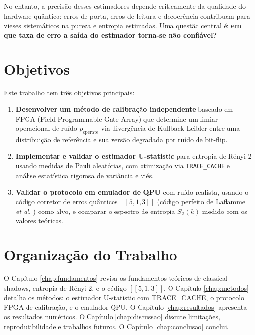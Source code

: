 \documentclass[12pt,a4paper,oneside]{book}
\theoremstyle{definition}
\theoremstyle{remark}
\begin{document}
No entanto, a precisão desses estimadores depende criticamente da qualidade do hardware quântico: erros de porta, erros de leitura e decoerência contribuem para vieses sistemáticos na pureza e entropia estimadas. Uma questão central é: \textbf{em que taxa de erro a saída do estimador torna-se não confiável?}

\section{Objetivos}

Este trabalho tem três objetivos principais:

\begin{enumerate}
    \item \textbf{Desenvolver um método de calibração independente} baseado em FPGA (Field-Programmable Gate Array) que determine um limiar operacional de ruído $p_{\text{operate}}$ via divergência de Kullback-Leibler entre uma distribuição de referência e sua versão degradada por ruído de bit-flip.

    \item \textbf{Implementar e validar o estimador U-statistic} para entropia de Rényi-2 usando medidas de Pauli aleatórias, com otimização via \texttt{TRACE\_CACHE} e análise estatística rigorosa de variância e viés.

    \item \textbf{Validar o protocolo em emulador de QPU} com ruído realista, usando o código corretor de erros quânticos $[[5,1,3]]$ (código perfeito de Laflamme \textit{et al.} \cite{laflamme1996perfect}) como alvo, e comparar o espectro de entropia $S_2(k)$ medido com os valores teóricos.
\end{enumerate}

\section{Organização do Trabalho}

O Capítulo \ref{chap:fundamentos} revisa os fundamentos teóricos de classical shadows, entropia de Rényi-2, e o código $[[5,1,3]]$. O Capítulo \ref{chap:metodos} detalha os métodos: o estimador U-statistic com TRACE\_CACHE, o protocolo FPGA de calibração, e o emulador QPU. O Capítulo \ref{chap:resultados} apresenta os resultados numéricos. O Capítulo \ref{chap:discussao} discute limitações, reprodutibilidade e trabalhos futuros. O Capítulo \ref{chap:conclusao} conclui.

\end{document}
